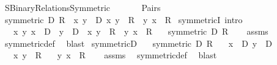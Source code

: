 %
\begin{isabellebody}%
%
%
\isadelimdocument
%
\endisadelimdocument
%
\isatagdocument
%
\isamarkuptrue%
%
\endisatagdocument
{\isafolddocument}%
%
\isadelimdocument
%
\endisadelimdocument
%
\isadelimtheory
%
\endisadelimtheory
%
\isatagtheory
{}\isamarkupfalse%
\ SBinary{\isacharunderscore}{\kern0pt}Relations{\isacharunderscore}{\kern0pt}Symmetric\isanewline
\ \ \isanewline
\ \ \ \ Pairs\isanewline
{}%
\endisatagtheory
{\isafoldtheory}%
%
\isadelimtheory
\isanewline
%
\endisadelimtheory
\isanewline
{}\isamarkupfalse%
\ {\isachardoublequoteopen}symmetric\ D\ R\ {\isasymequiv}\ {\isasymforall}x\ y\ {\isasymin}\ D{\isachardot}{\kern0pt}\ {\isasymlangle}x{\isacharcomma}{\kern0pt}\ y{\isasymrangle}\ {\isasymin}\ R\ {\isasymlongrightarrow}\ {\isasymlangle}y{\isacharcomma}{\kern0pt}\ x{\isasymrangle}\ {\isasymin}\ R{\isachardoublequoteclose}\isanewline
\isanewline
{}\isamarkupfalse%
\ symmetricI\ {\isacharbrackleft}{\kern0pt}intro{\isacharbrackright}{\kern0pt}{\isacharcolon}{\kern0pt}\isanewline
\ \ \ {\isachardoublequoteopen}{\isasymAnd}x\ y{\isachardot}{\kern0pt}\ x\ {\isasymin}\ D\ {\isasymLongrightarrow}\ y\ {\isasymin}\ D\ {\isasymLongrightarrow}\ {\isasymlangle}x{\isacharcomma}{\kern0pt}\ y{\isasymrangle}\ {\isasymin}\ R\ {\isasymLongrightarrow}\ {\isasymlangle}y{\isacharcomma}{\kern0pt}\ x{\isasymrangle}\ {\isasymin}\ R{\isachardoublequoteclose}\isanewline
\ \ \ {\isachardoublequoteopen}symmetric\ D\ R{\isachardoublequoteclose}\isanewline
%
\isadelimproof
\ \ %
\endisadelimproof
%
\isatagproof
{}\isamarkupfalse%
\ assms\ \isamarkupfalse%
\ symmetric{\isacharunderscore}{\kern0pt}def\ \isamarkupfalse%
\ blast%
\endisatagproof
{\isafoldproof}%
%
\isadelimproof
\isanewline
%
\endisadelimproof
\isanewline
{}\isamarkupfalse%
\ symmetricD{\isacharcolon}{\kern0pt}\isanewline
\ \ \ {\isachardoublequoteopen}symmetric\ D\ R{\isachardoublequoteclose}\isanewline
\ \ \ {\isachardoublequoteopen}x\ {\isasymin}\ D{\isachardoublequoteclose}\ {\isachardoublequoteopen}y\ {\isasymin}\ D{\isachardoublequoteclose}\isanewline
\ \ \ {\isachardoublequoteopen}{\isasymlangle}x{\isacharcomma}{\kern0pt}\ y{\isasymrangle}\ {\isasymin}\ R{\isachardoublequoteclose}\isanewline
\ \ \ {\isachardoublequoteopen}{\isasymlangle}y{\isacharcomma}{\kern0pt}\ x{\isasymrangle}\ {\isasymin}\ R{\isachardoublequoteclose}\isanewline
%
\isadelimproof
\ \ %
\endisadelimproof
%
\isatagproof
{}\isamarkupfalse%
\ assms\ \isamarkupfalse%
\ symmetric{\isacharunderscore}{\kern0pt}def\ \isamarkupfalse%
\ blast%
\endisatagproof
{\isafoldproof}%
%
\isadelimproof
\isanewline
%
\endisadelimproof
\isanewline
%
\isadelimtheory
\isanewline
%
\endisadelimtheory
%
\isatagtheory
{}\isamarkupfalse%
%
\endisatagtheory
{\isafoldtheory}%
%
\isadelimtheory
%
\endisadelimtheory
%
\end{isabellebody}%
